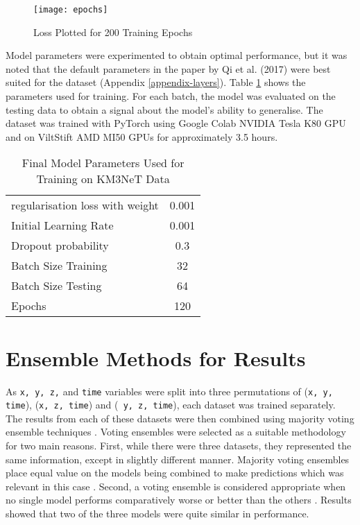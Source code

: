 \begin{figure}[ht!]
    \centering
    \texttt{[image: epochs]}
    \caption{Loss Plotted for 200 Training Epochs}
    \label{fig:epochs}
\end{figure}

Model parameters were experimented to obtain optimal performance, but it was noted that the default parameters in the paper by Qi et al. (2017) were best suited for the dataset \cite{qi2017pointnet} (Appendix \ref{appendix-layers}). Table \ref{tab:model_parameters} shows the parameters used for training. For each batch, the model was evaluated on the testing data to obtain a signal about the model's ability to generalise. The dataset was trained with PyTorch using Google Colab NVIDIA Tesla K80 GPU and on ViltStift AMD MI50 GPUs for approximately 3.5 hours.

\begin{table} [ht!]
    \centering
    \begin{tabular}{l c}
    \hline
        regularisation loss with weight & 0.001  \\
        Initial Learning Rate & 0.001 \\
        Dropout probability & 0.3 \\
        Batch Size Training & 32 \\
        Batch Size Testing & 64 \\
        Epochs & 120\\
    \hline
    \end{tabular}
    \caption{Final Model Parameters Used for Training on KM3NeT Data}
    \label{tab:model_parameters}
\end{table}

 
\section{Ensemble Methods for Results}
As \texttt{x, y, z,} and \texttt{time} variables were split into three permutations of (\texttt{x, y, time}), (\texttt{x, z, time}) and (\texttt{ y, z, time}), each dataset was trained separately. The results from each of these datasets were then combined using majority voting ensemble techniques \cite{goodfellow2016convolutional}. Voting ensembles were selected as a suitable methodology for two main reasons. First, while there were three datasets, they represented the same information, except in slightly different manner. Majority voting ensembles place equal value on the models being combined to make predictions which was relevant in this case \cite{bhowan2012evolving}. Second, a voting ensemble is considered appropriate when no single model performs comparatively worse or better than the others \cite{bhowan2012evolving}. Results showed that two of the three models were quite similar in performance.

